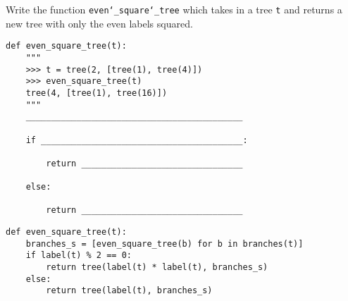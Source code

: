 \begin{blocksection}
\question Write the function \texttt{even\char`_square\char`_tree} which takes in a
tree \texttt{t} and returns a new tree with only the even labels squared.
\end{blocksection}

\begin{lstlisting}
def even_square_tree(t):
    """
    >>> t = tree(2, [tree(1), tree(4)])
    >>> even_square_tree(t)
    tree(4, [tree(1), tree(16)])
    """
    ___________________________________________

    if ________________________________________:

        return ________________________________

    else:

        return ________________________________

\end{lstlisting}

\begin{solution}
\begin{lstlisting}
def even_square_tree(t):
    branches_s = [even_square_tree(b) for b in branches(t)]
    if label(t) % 2 == 0:
        return tree(label(t) * label(t), branches_s)
    else:
        return tree(label(t), branches_s)
\end{lstlisting}
\end{solution}
